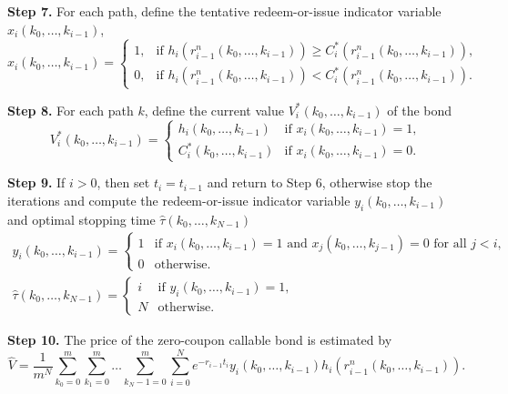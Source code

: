 \documentclass[10pt,a4paper]{amsart}
\numberwithin{equation}{section}
\begin{document}
\noindent\textbf{Step 7.} For each path, define the tentative redeem-or-issue indicator 
variable $x_i\left(k_0,\dots,k_{i-1}\right)$,
\[
 x_i\left(k_0,\dots,k_{i-1}\right)
 =\begin{cases}
1, & \text{if } h_i\left(r_{i-1}^{n}\left(k_0,\dots,k_{i-1}\right)\right)
 \geq C_i^*\left(r_{i-1}^{n}\left(k_0,\dots,k_{i-1}\right)\right) ,\\
0, & \text{if } h_i\left(r_{i-1}^{n}\left(k_0,\dots,k_{i-1}\right)
 \right)<C_i^*\left(r_{i-1}^{n}\left(k_0,\dots,k_{i-1}\right)\right).
\end{cases}
\]
\smallskip

\noindent\textbf{Step 8.} For each path $k$, define the current value 
$V_i^*\left(k_0,\dots,k_{i-1}\right)$ of the bond
\[
 V_i^*\left(k_0,\dots,k_{i-1}\right)
 = \begin{cases}
 h_i\left(k_0,\dots,k_{i-1}\right) & \text{if } x_i\left(k_0,\dots,k_{i-1}\right)=1, \\
 C_i^*\left(k_0,\dots,k_{i-1}\right) & \text{if } x_i\left(k_0,\dots,k_{i-1}\right)=0 .
 \end{cases}
\]
\smallskip

\noindent\textbf{Step 9.} If $i>0$, then set $t_i=t_{i-1}$ and return to Step 6, 
otherwise stop the iterations and compute the redeem-or-issue indicator variable 
$y_i\left(k_0,\dots,k_{i-1}\right)$ and optimal stopping time
$\hat{\tau}\left(k_0,\dots,k_{N-1}\right)$
\begin{gather*}
 y_i\left(k_0,\dots,k_{i-1}\right)
 = \begin{cases}1 & \text{if } x_i\left(k_0,\dots,k_{i-1}\right)=1 
 \text{ and } x_j\left(k_0,\dots,k_{j-1}\right)=0 \text{ for all } j<i, \\
 0 & \text{otherwise. }
 \end{cases}
\\
 \hat{\tau}\left(k_0,\dots,k_{N-1}\right)
 = \begin{cases}i & \text{if } y_i\left(k_0,\dots,k_{i-1}\right)=1 , \\
 N & \text{otherwise.}
 \end{cases}
\end{gather*}
\smallskip

\noindent\textbf{Step 10.} The price of the zero-coupon callable bond is estimated by
\begin{equation}
\label{hatv}
 \hat{V}=\frac{1}{m^N} \sum_{k_0=0}^m \sum_{k_1=0}^m \dots \sum_{k_N-1=0}^m
 \sum_{i=0}^N e^{-r_{i-1} t_i} y_i\left(k_0,\dots,k_{i-1}\right)
  h_i\left(r_{i-1}^{n}\left(k_0,\dots,k_{i-1}\right)\right).
\end{equation}
\end{document}
